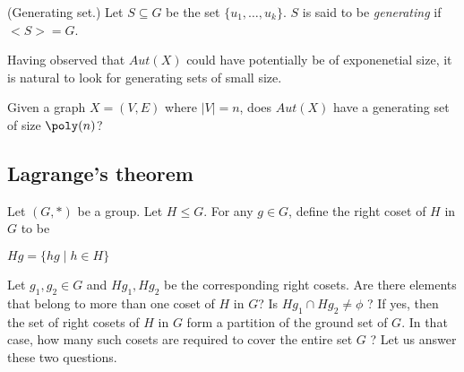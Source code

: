 \begin{definition}(Generating set.)
Let $S\subseteq G$ be the set $\{u_1,\ldots,u_k\}$. $S$ is said to be {\em generating} if $<S>=G$.  
\end{definition}

Having observed that $Aut(X)$ could have potentially be of exponenetial size, it is natural to look for generating sets of small size.

Given a graph $X=(V,E)$ where $|V|=n$, does $Aut(X)$ have a generating set of size $\poly(n)$?

\subsection{Lagrange's theorem}

Let $(G,*)$ be a group. Let $H\leq G$. For any $g\in G$, define the right coset of $H$ in $G$ to be
\begin{center}
$Hg= \{hg \mid h\in H \}$
\end{center}
 

Let $g_1,g_2\in G$ and $Hg_1,Hg_2$ be the corresponding right cosets.  Are there elements that belong to more than one coset of $H$ in $G$? Is $Hg_1\cap Hg_2 \neq \phi$ ? If yes, then the set of right cosets of $H$ in $G$ form a partition of the ground set of $G$. In that case, how many such cosets are required to cover the entire set $G$ ? Let us answer these two questions.

